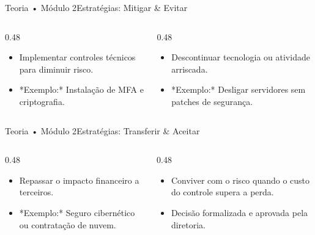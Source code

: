 \begin{senaiframe}{Teoria • Módulo 2}{Estratégias: Mitigar \& Evitar}
  \begin{columns}[t]
    \begin{column}{0.48\textwidth}
      \begin{tcolorbox}[senaibluecard, title={Mitigar (Reduzir)}]
        \begin{itemize}
          \item Implementar controles técnicos para diminuir risco.
          \item *Exemplo:* Instalação de MFA e criptografia.
        \end{itemize}
      \end{tcolorbox}
    \end{column}
    \begin{column}{0.48\textwidth}
      \begin{tcolorbox}[senairedcard, title={Evitar (Eliminar)}]
        \begin{itemize}
          \item Descontinuar tecnologia ou atividade arriscada.
          \item *Exemplo:* Desligar servidores sem patches de segurança.
        \end{itemize}
      \end{tcolorbox}
    \end{column}
  \end{columns}
\end{senaiframe}

\begin{senaiframe}{Teoria • Módulo 2}{Estratégias: Transferir \& Aceitar}
  \begin{columns}[t]
    \begin{column}{0.48\textwidth}
      \begin{tcolorbox}[senaiambercard, title={Transferir (Compartilhar)}]
        \begin{itemize}
          \item Repassar o impacto financeiro a terceiros.
          \item *Exemplo:* Seguro cibernético ou contratação de nuvem.
        \end{itemize}
      \end{tcolorbox}
    \end{column}
    \begin{column}{0.48\textwidth}
      \begin{tcolorbox}[senaicard, title={Aceitar (Risco Residual)}]
        \begin{itemize}
          \item Conviver com o risco quando o custo do controle supera a perda.
          \item Decisão formalizada e aprovada pela diretoria.
        \end{itemize}
      \end{tcolorbox}
    \end{column}
  \end{columns}
\end{senaiframe}

